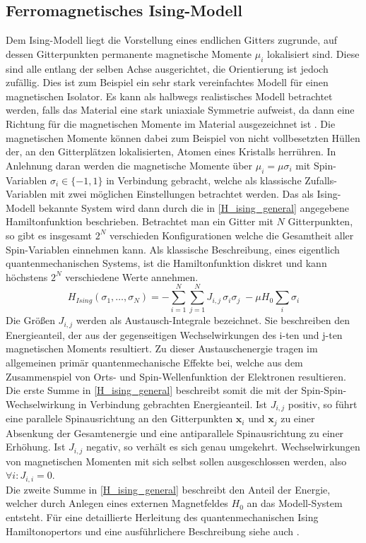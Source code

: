 \subsection{Ferromagnetisches Ising-Modell} \label{sec: Ferromagnetisches Ising-Modell}

Dem Ising-Modell liegt die Vorstellung eines endlichen Gitters zugrunde, auf dessen Gitterpunkten permanente magnetische Momente $\mu_i$ lokalisiert sind. Diese sind alle entlang der selben Achse ausgerichtet, die Orientierung ist jedoch zufällig. Dies ist zum Beispiel ein sehr stark vereinfachtes Modell für einen magnetischen Isolator. Es kann als halbwegs realistisches Modell betrachtet werden, falls das Material eine stark uniaxiale Symmetrie aufweist, da dann eine Richtung für die magnetischen Momente im Material ausgezeichnet ist \cite{StatPhys_Nolting_K4}. Die magnetischen Momente können dabei zum Beispiel von nicht vollbesetzten Hüllen der, an den Gitterplätzen lokalisierten, Atomen eines Kristalls herrühren. In Anlehnung daran werden die magnetische Momente über $\mu_i = \mu \sigma_i$  mit Spin-Variablen $\sigma_i \in \{-1, 1\}$ in Verbindung gebracht, welche als klassische Zufalls-Variablen mit zwei möglichen Einstellungen betrachtet werden. Das als Ising-Modell bekannte System wird dann durch die in \eqref{H_ising_general} angegebene Hamiltonfunktion beschrieben. Betrachtet man ein Gitter mit $N$ Gitterpunkten, so gibt es insgesamt $2^N$ verschieden Konfigurationen welche die Gesamtheit aller Spin-Variablen einnehmen kann. Als klassische Beschreibung, eines eigentlich quantenmechanischen Systems, ist die Hamiltonfunktion diskret und kann höchstens $2^N$ verschiedene Werte annehmen. 
\begin{equation} \label{H_ising_general}
H_{Ising}(\sigma_1, \dots, \sigma_N) = - \sum_{i=1}^N \sum_{j=1}^N J_{i,j} \,\sigma_i \sigma_j \;- \mu H_0 \sum_{i} \sigma_i 
\end{equation}
\noindent Die Größen $J_{i,j}$ werden als Austausch-Integrale bezeichnet. Sie beschreiben den Energieanteil, der aus der gegenseitigen Wechselwirkungen des i-ten und j-ten magnetischen Moments resultiert. Zu dieser Austauschenergie tragen im allgemeinen primär quantenmechanische Effekte bei, welche aus dem Zusammenspiel von Orts- und Spin-Wellenfunktion der Elektronen resultieren. Die erste Summe in \eqref{H_ising_general} beschreibt somit die mit der Spin-Spin-Wechselwirkung in Verbindung gebrachten Energieanteil. Ist $J_{i,j}$ positiv, so führt eine parallele Spinausrichtung an den Gitterpunkten $\bm{x}_i$ und $\bm{x}_j$ zu einer Absenkung der Gesamtenergie und eine antiparallele Spinausrichtung zu einer Erhöhung. Ist $J_{i,j}$ negativ, so verhält es sich genau umgekehrt. Wechselwirkungen von magnetischen Momenten mit sich selbst sollen ausgeschlossen werden, also $\forall i : J_{i,i} = 0$. \\
\noindent Die zweite Summe in \eqref{H_ising_general} beschreibt den Anteil der Energie, welcher durch Anlegen eines externen Magnetfeldes $H_0$ an das Modell-System entsteht.
Für eine detaillierte Herleitung des quantenmechanischen Ising Hamiltonopertors und eine ausführlichere Beschreibung siehe auch \cite{MarxGross2014}.\\

